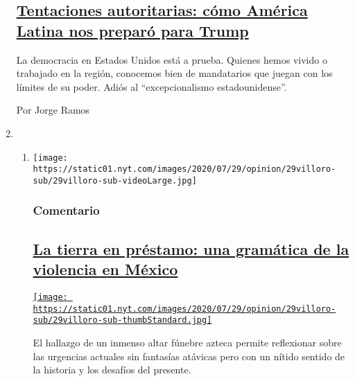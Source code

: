 \begin{enumerate}
  \hypertarget{tentaciones-autoritarias-cuxf3mo-amuxe9rica-latina-nos-preparuxf3-para-trump}{%
  \subsection{\texorpdfstring{\href{/es/2020/08/01/espanol/opinion/trump-autoritarismo.html}{Tentaciones
  autoritarias: cómo América Latina nos preparó para
  Trump}}{Tentaciones autoritarias: cómo América Latina nos preparó para Trump}}\label{tentaciones-autoritarias-cuxf3mo-amuxe9rica-latina-nos-preparuxf3-para-trump}}

  La democracia en Estados Unidos está a prueba. Quienes hemos vivido o
  trabajado en la región, conocemos bien de mandatarios que juegan con
  los límites de su poder. Adiós al ``excepcionalismo estadounidense''.

  Por Jorge Ramos
\item
  \begin{enumerate}
  \def\labelenumii{\arabic{enumii}.}
  \item
    \texttt{[image: https://static01.nyt.com/images/2020/07/29/opinion/29villoro-sub/29villoro-sub-videoLarge.jpg]}

    \hypertarget{comentario-1}{%
    \subsubsection{Comentario}\label{comentario-1}}

    \hypertarget{la-tierra-en-pruxe9stamo-una-gramuxe1tica-de-la-violencia-en-muxe9xico}{%
    \subsection{\texorpdfstring{\href{/es/2020/07/30/espanol/opinion/aztecas-violencia-narco-amlo.html}{La
    tierra en préstamo: una gramática de la violencia en
    México}}{La tierra en préstamo: una gramática de la violencia en México}}\label{la-tierra-en-pruxe9stamo-una-gramuxe1tica-de-la-violencia-en-muxe9xico}}

    \href{/es/2020/07/30/espanol/opinion/aztecas-violencia-narco-amlo.html}{\texttt{[image: https://static01.nyt.com/images/2020/07/29/opinion/29villoro-sub/29villoro-sub-thumbStandard.jpg]}}

    El hallazgo de un inmenso altar fúnebre azteca permite reflexionar
    sobre las urgencias actuales sin fantasías atávicas pero con un
    nítido sentido de la historia y los desafíos del presente.


\end{enumerate}
\end{enumerate}
